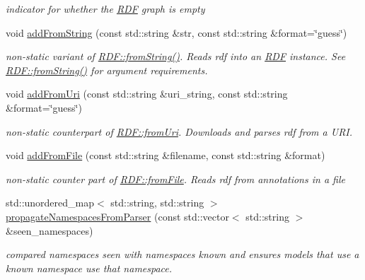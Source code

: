 \begin{DoxyCompactItemize}
\begin{DoxyCompactList}\small\item\em indicator for whether the \hyperlink{classomexmeta_1_1RDF}{R\+DF} graph is empty \end{DoxyCompactList}\item 
\mbox{\label{classomexmeta_1_1RDF_a9a29912bc44d47d371a2357b75194fc3}} 
void \hyperlink{classomexmeta_1_1RDF_a9a29912bc44d47d371a2357b75194fc3}{add\+From\+String} (const std\+::string \&str, const std\+::string \&format=\char`\"{}guess\char`\"{})
\begin{DoxyCompactList}\small\item\em non-\/static variant of \hyperlink{classomexmeta_1_1RDF_a9d91b3134cdcc6dfef6d62b7b09d8da2}{R\+D\+F\+::from\+String()}. Reads rdf into an \hyperlink{classomexmeta_1_1RDF}{R\+DF} instance. See \hyperlink{classomexmeta_1_1RDF_a9d91b3134cdcc6dfef6d62b7b09d8da2}{R\+D\+F\+::from\+String()} for argument requirements. \end{DoxyCompactList}\item 
void \hyperlink{classomexmeta_1_1RDF_af99201be3782319d32e963ca7bed5b2b}{add\+From\+Uri} (const std\+::string \&uri\+\_\+string, const std\+::string \&format=\char`\"{}guess\char`\"{})
\begin{DoxyCompactList}\small\item\em non-\/static counterpart of \hyperlink{classomexmeta_1_1RDF_a03906aa5c3b9429a2afdbe0ad2be21e6}{R\+D\+F\+::from\+Uri}. Downloads and parses rdf from a U\+RI. \end{DoxyCompactList}\item 
void \hyperlink{classomexmeta_1_1RDF_ac88eeb1a0f6911a2c1e4c43cef1b9047}{add\+From\+File} (const std\+::string \&filename, const std\+::string \&format)
\begin{DoxyCompactList}\small\item\em non-\/static counter part of \hyperlink{classomexmeta_1_1RDF_a98a1da84161a7935bf38ec5e5d34e91f}{R\+D\+F\+::from\+File}. Reads rdf from annotations in a file \end{DoxyCompactList}\item 
std\+::unordered\+\_\+map$<$ std\+::string, std\+::string $>$ \hyperlink{classomexmeta_1_1RDF_af5f598560ab2a4ebe661f9bdb8665755}{propagate\+Namespaces\+From\+Parser} (const std\+::vector$<$ std\+::string $>$ \&seen\+\_\+namespaces)
\begin{DoxyCompactList}\small\item\em compared namespaces seen with namespaces known and ensures models that use a known namespace use that namespace. \end{DoxyCompactList}\item 

\end{DoxyCompactItemize}
